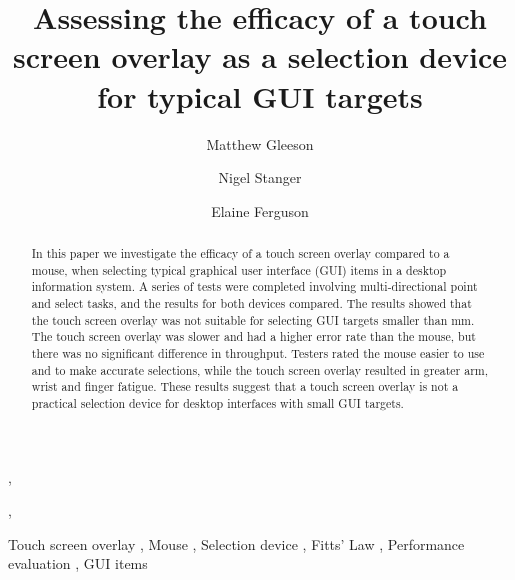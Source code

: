 \documentclass{elsart}
\begin{document}
\begin{frontmatter}



\title{Assessing the efficacy of a touch screen overlay as a selection
device for typical GUI targets}


\author[info]{Matthew Gleeson},
\author[info]{Nigel Stanger},
\author[hunt]{Elaine Ferguson}

\address[info]{Department of Information Science,}
\address[hunt]{Department of Human Nutrition, \\ University of Otago, PO Box 56, Dunedin, New Zealand}


\begin{abstract}

In this paper we investigate the efficacy of a touch screen overlay
compared to a mouse, when selecting typical graphical user interface
(GUI) items in a desktop information system. A series of tests were
completed involving multi-directional point and select tasks, and the
results for both devices compared. The results showed that the touch
screen overlay was not suitable for selecting GUI targets smaller than
\unit[4]{mm}. The touch screen overlay was slower and had a higher error
rate than the mouse, but there was no significant difference in
throughput. Testers rated the mouse easier to use and to make accurate
selections, while the touch screen overlay resulted in greater arm,
wrist and finger fatigue. These results suggest that a touch screen
overlay is not a practical selection device for desktop interfaces with
small GUI targets.

\end{abstract}

\begin{keyword}
Touch screen overlay \sep
Mouse \sep
Selection device \sep
Fitts' Law \sep
Performance evaluation \sep
GUI items
\end{keyword}

\end{frontmatter}
\end{document}
